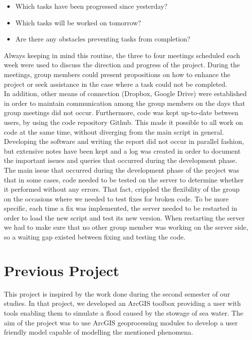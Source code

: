\begin{itemize}
\item Which tasks have been progressed since yesterday?
\item Which tasks will be worked on tomorrow?
\item Are there any obstacles preventing tasks from completion?
\end{itemize}

Always keeping in mind this routine, the three to four meetings scheduled each week were used to discuss the direction and progress of the project. 
During the meetings, group members could present propositions on how to enhance the project or seek assistance in the case where a task could not be completed. \\
In addition, other means of connection (Dropbox, Google Drive) were established in order to maintain communication among the group members on the days that group meetings did not occur. Furthermore, code was kept up-to-date between users, by using the code repository Github. This made it possible to all work on code at the same time, without diverging from the main script in general. \\
Developing the software and writing the report did not occur in parallel fashion, but extensive notes have been kept and a log was created in order to document the important issues and queries that occurred during the development phase. \\

The main issue that occurred during the development phase of the project was that in some cases, code needed to be tested on the server to determine whether it performed without any errors. That fact, crippled the flexibility of the group on the occasions where we needed to test fixes for broken code. To be more specific, each time a fix was implemented, the server needed to be restarted in order to load the new script and test its new version. When restarting the server we had to make sure that no other group member was working on the server side, so a waiting gap existed between fixing and testing the code.\\

\section{Previous Project}
This project is inspired by the work done during the second semester of our studies. In that project, we developed an ArcGIS toolbox providing a user with tools enabling them to simulate a flood caused by the stowage of sea water. The aim of the project was to use ArcGIS geoprocessing modules to develop a user friendly model capable of modelling the mentioned phenomena. \\

